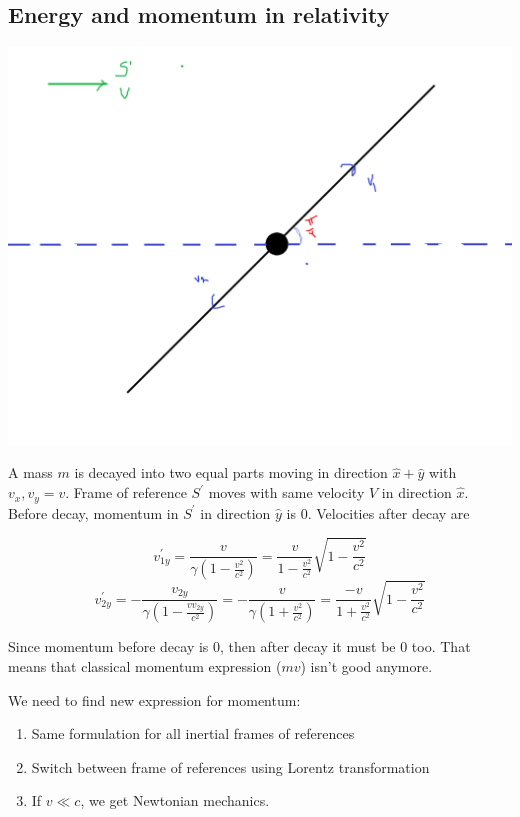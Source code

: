   \subsection{Energy and momentum in relativity}
  
  
  \begin{center}
  	\includegraphics[width=\linewidth]{./lect23/pic1.png}
  \end{center}
  
  
  A mass $m$ is decayed into two equal parts moving in direction $\hat{x}+\hat{y}$ with $v_x, v_y = v$. Frame of reference $S^\prime$ moves with same velocity $V$ in direction $\hat{x}$. Before decay, momentum in $S^\prime$ in direction $\hat{y}$ is $0$. Velocities after decay are
  
  $$v_{1y}^\prime = \frac{v}{\gamma \left( 1 - \frac{v^2}{c^2} \right)} = \frac{v}{1-\frac{v^2}{c^2}}\sqrt{1-\frac{v^2}{c^2}}$$
  $$v_{2y}^\prime = -\frac{v_{2y}}{\gamma \left( 1 - \frac{vv_{2y}}{c^2} \right)} = -\frac{v}{\gamma \left( 1 + \frac{v^2}{c^2} \right)} = \frac{-v}{1+\frac{v^2}{c^2}}\sqrt{1-\frac{v^2}{c^2}}$$
  
  Since momentum before decay is 0, then after decay it must be 0 too. That means that classical momentum expression ($mv$) isn't good anymore.
  
  We need to find new expression for momentum:
  
  \begin{enumerate}
  	\item Same formulation for all inertial frames of references
  	\item Switch between frame of references using Lorentz transformation
  	\item If $v \ll c$, we get Newtonian mechanics.
  \end{enumerate}
  
